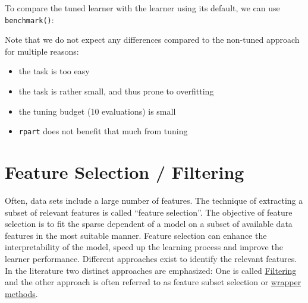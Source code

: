 \documentclass[
  11pt,
  parskip=half,
  DIV=calc,
  BCOR=10mm,
  x11names]{scrbook}
\newenvironment{Shaded}{}{}
\newcommand{\DataTypeTok}[1]{#1}
\newcommand{\DecValTok}[1]{#1}
\newcommand{\KeywordTok}[1]{\textcolor[rgb]{0.00,0.00,1.00}{#1}}
\newcommand{\NormalTok}[1]{#1}
\newcommand{\OperatorTok}[1]{#1}
\newcommand{\StringTok}[1]{\textcolor[rgb]{0.00,0.50,0.50}{#1}}
\providecommand{\tightlist}{%
  \setlength{\itemsep}{0pt}\setlength{\parskip}{0pt}}
\begin{document}
To compare the tuned learner with the learner using its default, we can use \texttt{benchmark()}:

\begin{Shaded}
\end{Shaded}

Note that we do not expect any differences compared to the non-tuned approach for multiple reasons:

\begin{itemize}
\tightlist
\item
  the task is too easy
\item
  the task is rather small, and thus prone to overfitting
\item
  the tuning budget (10 evaluations) is small
\item
  \texttt{rpart} does not benefit that much from tuning
\end{itemize}

\hypertarget{fs}{%
\section{Feature Selection / Filtering}\label{fs}}

Often, data sets include a large number of features.
The technique of extracting a subset of relevant features is called ``feature selection''.
The objective of feature selection is to fit the sparse dependent of a model on a subset of available data features in the most suitable manner.
Feature selection can enhance the interpretability of the model, speed up the learning process and improve the learner performance.
Different approaches exist to identify the relevant features.
In the literature two distinct approaches are emphasized:
One is called \protect\hyperlink{fs-filtering}{Filtering} and the other approach is often referred to as feature subset selection or \protect\hyperlink{fs-wrapper}{wrapper methods}.
\end{document}
